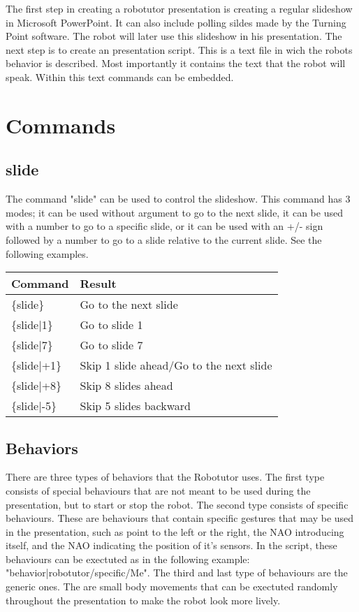 The first step in creating a robotutor presentation is creating a regular slideshow in Microsoft PowerPoint. It can also include polling sildes made by the Turning Point software. The robot will later use this slideshow in his presentation. The next step is to create an presentation script. This is a text file in wich the robots behavior is described. Most importantly it contains the text that the robot will speak. Within this text commands can be embedded.


\section{Commands}
\subsection{slide}
The command "slide" can be used to control the slideshow. This command has 3 modes; it can be used without argument to go to the next slide, it can be used with a number to go to a specific slide, or it can be used with an +/- sign followed by a number to go to a slide relative to the current slide. See the following examples.


\begin{table}[h!]
\begin{tabular}{|l|l|}
\hline
Command & Result\\ \hline
\{slide\}& Go to the next slide\\ 
\{slide|1\}  & Go to slide 1\\ 
\{slide|7\}  & Go to slide 7\\ 
\{slide|+1\} & Skip 1 slide ahead/Go to the next slide \\ 
\{slide|+8\} & Skip 8 slides ahead\\ 
\{slide|-5\} & Skip 5 slides backward\\
\hline
\end{tabular}
\end{table}


\subsection{Behaviors}
There are three types of behaviors that the Robotutor uses. The first type consists of special behaviours that are not meant to be used during the presentation, but to start or stop the robot.
The second type consists of specific behaviours. These are behaviours that contain specific gestures that may be used in the presentation, such as point to the left or the right, the NAO introducing itself, and the NAO indicating the position of it's sensors. In the script, these behaviours can be exectuted as in the following example: "{behavior|robotutor/specific/Me}".
The third and last type of behaviours are the generic ones. The are small body movements that can be exectuted randomly throughout the presentation to make the robot look more lively.


